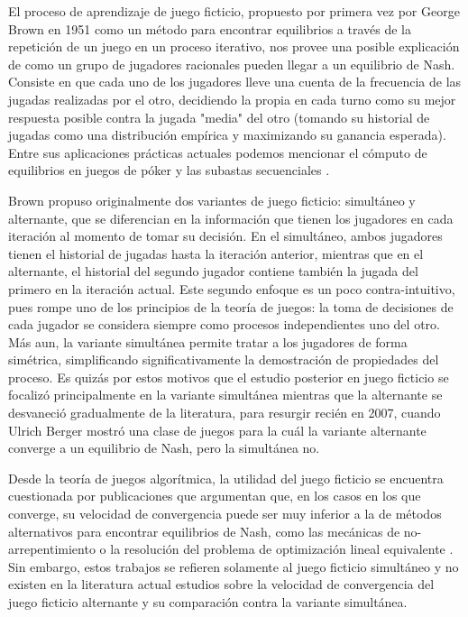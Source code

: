 El proceso de aprendizaje de juego ficticio, propuesto por primera vez por George Brown en 1951 \cite{brown:1951} como un método para encontrar equilibrios a través de la repetición de un juego en un proceso iterativo, nos provee una posible explicación de como un grupo de jugadores racionales pueden llegar a un equilibrio de Nash. Consiste en que cada uno de los jugadores lleve una cuenta de la frecuencia de las jugadas realizadas por el otro, decidiendo la propia en cada turno como su mejor respuesta posible contra la jugada "media" del otro (tomando su historial de jugadas como una distribución empírica y maximizando su ganancia esperada). Entre sus aplicaciones prácticas actuales podemos mencionar el cómputo de equilibrios en juegos de póker \cite{casos:uso:poker} y las subastas secuenciales \cite{casos:uso:subastas:secuenciales}.

Brown propuso originalmente dos variantes de juego ficticio: simultáneo y alternante, que se diferencian en la información que tienen los jugadores en cada iteración al momento de tomar su decisión. En el simultáneo, ambos jugadores tienen el historial de jugadas hasta la iteración anterior, mientras que en el alternante, el historial del segundo jugador contiene también la jugada del primero en la iteración actual. Este segundo enfoque es un poco contra-intuitivo, pues rompe uno de los principios de la teoría de juegos: la toma de decisiones de cada jugador se considera siempre como procesos independientes uno del otro. Más aun, la variante simultánea permite tratar a los jugadores de forma simétrica, simplificando significativamente la demostración de propiedades del proceso. Es quizás por estos motivos que el estudio posterior en juego ficticio se focalizó principalmente en la variante simultánea mientras que la alternante se desvaneció gradualmente de la literatura, para resurgir recién en 2007, cuando Ulrich Berger \cite{browns:original} mostró una clase de juegos para la cuál la variante alternante converge a un equilibrio de Nash, pero la simultánea no.

Desde la teoría de juegos algorítmica, la utilidad del juego ficticio se encuentra cuestionada por publicaciones que argumentan que, en los casos en los que converge, su velocidad de convergencia puede ser muy inferior a la de métodos alternativos para encontrar equilibrios de Nash, como las mecánicas de no-arrepentimiento o la resolución del problema de optimización lineal equivalente \cite{modified:fp:linear}. Sin embargo, estos trabajos se refieren solamente al juego ficticio simultáneo y no existen en la literatura actual estudios sobre la velocidad de convergencia del juego ficticio alternante y su comparación contra la variante simultánea.

